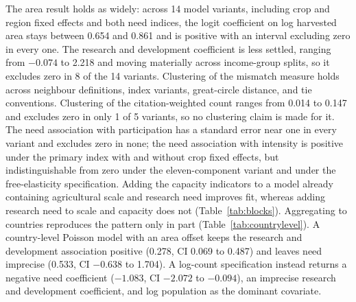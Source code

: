 \documentclass[ASNA,twocolumn]{USG}
\begin{document}
The area result holds as widely: across 14 model variants, including crop and region fixed
effects and both need indices, the logit coefficient on log harvested area stays between 0.654
and 0.861 and is positive with an interval excluding zero in every one. The research and
development coefficient is less settled, ranging from $-0.074$ to 2.218 and moving materially
across income-group splits, so it excludes zero in 8 of the 14 variants. Clustering of the
mismatch measure holds across neighbour definitions, index variants, great-circle distance, and
tie conventions. Clustering of the citation-weighted count ranges from 0.014 to 0.147 and
excludes zero in only 1 of 5 variants, so no clustering claim is made for it. The need
association with participation has a standard error near one in every variant and excludes zero
in none; the need association with intensity is positive under the primary index with and without crop
fixed effects, but indistinguishable from zero under the eleven-component variant and under the
free-elasticity specification. Adding the capacity indicators to a model already containing agricultural scale and research
need improves fit, whereas adding research need to scale and capacity does not
(Table~\ref{tab:blocks}). Aggregating to countries reproduces the pattern only in part
(Table~\ref{tab:countrylevel}). A
country-level Poisson model with an area offset keeps the research and development association
positive (0.278, CI 0.069 to 0.487) and leaves need imprecise (0.533, CI $-0.638$ to 1.704). A
log-count specification instead returns a negative need coefficient (\(-1.083\), CI $-2.072$ to
$-0.094$), an imprecise research and development coefficient, and log population as the dominant
covariate.
\end{document}
